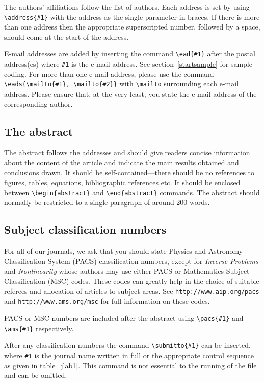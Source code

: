 \documentclass[12pt]{iopart}
\begin{document}
The authors' affiliations follow the list of authors. 
Each address is set by using
\verb"\address{#1}" with the address as the single parameter in braces. 
If there is more 
than one address then the appropriate superscripted number, followed by a space, should come at the start of
the address.
 
E-mail addresses are added by inserting the 
command \verb"\ead{#1}" after the postal address(es) where \verb"#1" is the e-mail address.  
See section~\ref{startsample} for sample coding. For more than one e-mail address, please use the command 
\verb"\eads{\mailto{#1}, \mailto{#2}}" with \verb"\mailto" surrounding each e-mail address.  Please ensure
that, at the very least, you state the e-mail address of the corresponding author.

\subsection{The abstract}
The abstract follows the addresses and
should give readers concise information about the content 
of the article and indicate the main results obtained and conclusions 
drawn. It should be self-contained---there should be no references to 
figures, tables, equations, bibliographic references etc.  It should be enclosed between \verb"\begin{abstract}"
and \verb"\end{abstract}" commands.  The abstract should normally be restricted 
to a single paragraph of around 200 words.

\subsection{Subject classification numbers}
For all of our journals, we ask that you should state Physics and Astronomy Classification System (PACS)
classification numbers, except for {\it Inverse Problems} and {\it Nonlinearity} whose authors may 
use either PACS or Mathematics Subject Classification (MSC) codes.  These codes
can greatly help in the choice of suitable referees and allocation of articles to subject areas.
See \verb"http://www.aip.org/pacs" and \verb"http://www.ams.org/msc" 
for full information on these codes.  

PACS or MSC numbers are included after the abstract 
using \verb"\pacs{#1}" and \verb"\ams{#1}" respectively.

After any classification numbers the command
\verb"\submitto{#1}" can be inserted, where \verb"#1" is the journal name written in full or the appropriate control sequence as
given in table~\ref{jlab1}. This command is not essential to the running of the file and can be omitted.
\end{document}
